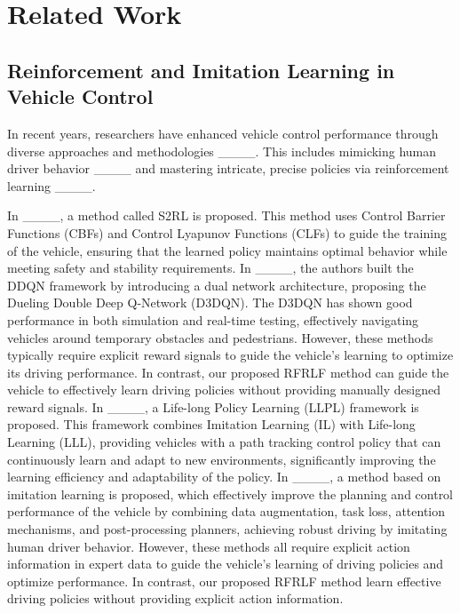 \section{Related Work}
\label{2}
\subsection{Reinforcement and Imitation Learning in Vehicle Control}
In recent years, researchers have enhanced vehicle control performance through diverse approaches and methodologies ____. This includes mimicking human driver behavior ____ and mastering intricate, precise policies via reinforcement learning ____.

In ____, a method called S2RL is proposed. This method uses Control Barrier Functions (CBFs) and Control Lyapunov Functions (CLFs) to guide the training of the vehicle, ensuring that the learned policy maintains optimal behavior while meeting safety and stability requirements. In ____, the authors built the DDQN framework by introducing a dual network architecture, proposing the Dueling Double Deep Q-Network (D3DQN). The D3DQN has shown good performance in both simulation and real-time testing, effectively navigating vehicles around temporary obstacles and pedestrians. However, these methods typically require explicit reward signals to guide the vehicle's learning to optimize its driving performance. In contrast, our proposed RFRLF method can guide the vehicle to effectively learn driving policies without providing manually designed reward signals. In ____, a Life-long Policy Learning (LLPL) framework is proposed. This framework combines Imitation Learning (IL) with Life-long Learning (LLL), providing vehicles with a path tracking control policy that can continuously learn and adapt to new environments, significantly improving the learning efficiency and adaptability of the policy. In ____, a method based on imitation learning is proposed, which effectively improve the planning and control performance of the vehicle by combining data augmentation, task loss, attention mechanisms, and post-processing planners, achieving robust driving by imitating human driver behavior. However, these methods all require explicit action information in expert data to guide the vehicle's learning of driving policies and optimize performance. In contrast, our proposed RFRLF method learn effective driving policies without providing explicit action information.

